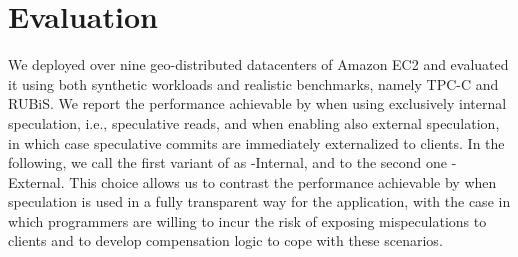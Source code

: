 
\section{Evaluation}
\label{sec:evaluation}
We deployed \specula over nine geo-distributed datacenters of Amazon EC2 and evaluated it using both synthetic workloads and realistic benchmarks, namely TPC-C and RUBiS. We report the performance achievable by \specula when using exclusively internal speculation, i.e., speculative reads, and when enabling also external speculation, in which case speculative commits are immediately externalized to clients. In the following, we call the first variant of \specula as  {\specula}-Internal, and to the second one {\specula}-External. This choice allows us to contrast the performance achievable by \specula when speculation is used in a fully transparent way for the application, with the case in which programmers are willing to incur the risk of exposing mispeculations to clients and to develop compensation logic to cope with these scenarios.

%
%

